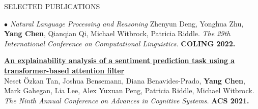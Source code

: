 \documentclass{resume} %
\begin{document}
\begin{rSection}{SELECTED PUBLICATIONS}
\begin{rSubsection}{\large\em $\bullet$ Natural Language Processing and Reasoning}{}{}{}
Zhenyun Deng, Yonghua Zhu, \textbf{Yang Chen}, Qianqian Qi, Michael Witbrock, Patricia Riddle. {\em The 29th International Conference on Computational Linguistics.} \textbf{COLING 2022.}\\
\item {\href{https://advancesincognitivesystems.github.io/acs2021/data/ACS-21_paper_22.pdf}{\bf An explainability analysis of a sentiment prediction task using a transformer-based attention filter}}\\
		Neset \"{O}zkan Tan, Joshua Bensemann, Diana Benavides-Prado, \textbf{Yang Chen}, Mark Gahegan, Lia Lee, Alex Yuxuan Peng, Patricia Riddle, Michael Witbrock. {\em The Ninth Annual Conference on Advances in Cognitive Systems.} \textbf{ACS 2021.}\\
\end{rSubsection}



\end{rSection}
\end{document}
